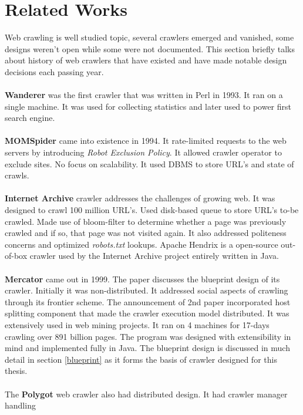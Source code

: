 \section{Related Works}
Web crawling is well studied topic, several crawlers emerged and vanished, some designs weren't open while
some were not documented. This section briefly talks about history of web crawlers that have existed and have made notable design decisions each passing year.
\\
\\
\textbf{Wanderer} was the first crawler that was written in Perl in 1993. It ran on a single machine. It was used for collecting statistics and later used to power first search engine. 
\\
\\
\textbf{MOMSpider} came into existence in 1994. It rate-limited requests to the web servers by introducing
\textit{Robot Exclusion Policy}. It allowed crawler operator to exclude sites. No focus on scalability. It
used DBMS to store URL's and state of crawls.
\\
\\
\textbf{Internet Archive} \cite{netarchive} crawler addresses the challenges of growing web. It was designed to crawl 100 million URL's. Used disk-based queue to store URL's to-be crawled. Made use of bloom-filter to determine whether a page was previously crawled and if so, that page was not visited again. It also addressed politeness concerns and optimized \textit{robots.txt} lookups. Apache Hendrix is a open-source out-of-box
crawler used by the Internet Archive project entirely written in Java.
\\
\\
\textbf{Mercator} \cite{mercator} came out in 1999. The paper discusses the blueprint design of its crawler. Initially it was non-distributed. It addressed social aspects of crawling through its frontier scheme. The announcement of 2nd paper incorporated host splitting component that made the crawler execution model distributed. It was extensively used in web mining projects. It ran on 4 machines for 17-days crawling over 891 billion pages. The program was designed with extensibility in mind and implemented fully in Java.
The blueprint design is discussed in much detail in section \ref{blueprint} as it forms the basis of
crawler designed for this thesis.
\\
\\
The \textbf{Polygot} web crawler also had distributed design. It had crawler manager handling
